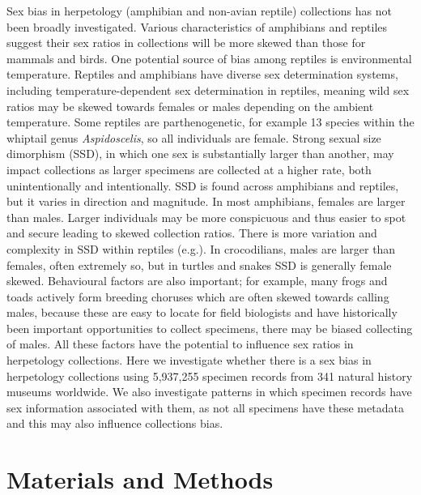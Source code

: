 \documentclass[a4paper, 12pt]{article}
\begin{document}
Sex bias in herpetology (amphibian and non-avian reptile) collections has not been broadly investigated.
Various characteristics of amphibians and reptiles suggest their sex ratios in collections will be more skewed than those for mammals and birds. 
One potential source of bias among reptiles is environmental temperature. 
Reptiles and amphibians have diverse sex determination systems\cite{miura2017sex,katona2021evolutionary}, including temperature-dependent sex determination in reptiles, meaning wild sex ratios may be skewed towards females or males depending on the ambient temperature\cite{mitchell2010demographic,holleley2015sex,while2018patterns,wild2022evolutionary}. 
Some reptiles are parthenogenetic, for example 13 species within the whiptail genus \textit{Aspidoscelis}\cite{barley2019complex}, so all individuals are female. 
Strong sexual size dimorphism (SSD), in which one sex is substantially larger than another, may impact collections as larger specimens are collected at a higher rate, both unintentionally and intentionally\cite{cooper2019sex,gower2019,thompson2020avian}.
SSD is found across amphibians and reptiles, but it varies in direction and magnitude\cite{slavenko2022}. 
In most amphibians, females are larger than males\cite{pincheira2021multiple}.
Larger individuals may be more conspicuous and thus easier to spot and secure leading to skewed collection ratios. 
There is more variation and complexity in SSD within reptiles (e.g.\cite{le2005sex}).
In crocodilians, males are larger than females, often extremely so, but in turtles and snakes SSD is generally female skewed\cite{slavenko2022}. 
Behavioural factors are also important; for example, many frogs and toads actively form breeding choruses which are often skewed towards calling males, because these are easy to locate for field biologists and have historically been important opportunities to collect specimens, there may be biased collecting of males. 
All these factors have the potential to influence sex ratios in herpetology collections. 
Here we investigate whether there is a sex bias in herpetology collections using 5,937,255 specimen records from 341 natural history museums worldwide\cite{gbif-amphibians,gbif-reptiles}. 
We also investigate patterns in which specimen records have sex information associated with them, as not all specimens have these metadata and this may also influence collections bias. 

\section{Materials and Methods}
\end{document}

